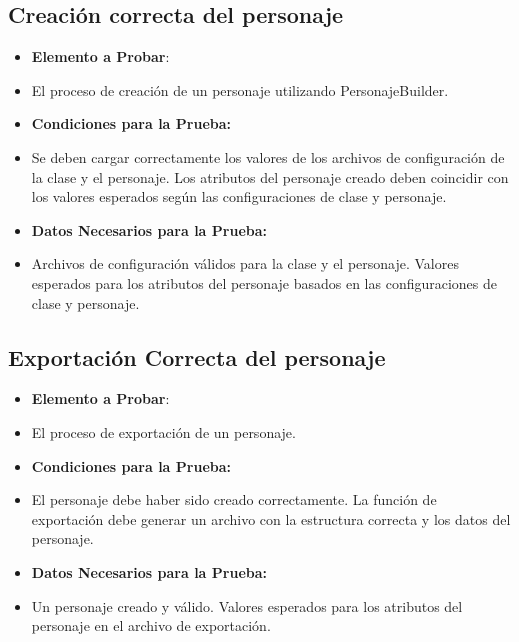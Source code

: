 \documentclass{article}
\begin{document}
\subsection{Creación correcta del personaje}
\renewcommand{\labelitemi}{}
\begin{itemize}

\item \textbf{Elemento a Probar}: 

\item El proceso de creación de un personaje utilizando PersonajeBuilder.

\item \textbf{Condiciones para la Prueba:}

\item Se deben cargar correctamente los valores de los archivos de configuración de la clase y el personaje.
Los atributos del personaje creado deben coincidir con los valores esperados según las configuraciones de clase y personaje.

\item \textbf{Datos Necesarios para la Prueba:}

\item Archivos de configuración válidos para la clase y el personaje.
Valores esperados para los atributos del personaje basados en las configuraciones de clase y personaje.

\end{itemize}

\subsection{Exportación Correcta del personaje}
\renewcommand{\labelitemi}{}
\begin{itemize}

\item \textbf{Elemento a Probar}:

\item El proceso de exportación de un personaje.

\item \textbf{Condiciones para la Prueba:}

\item El personaje debe haber sido creado correctamente.
La función de exportación debe generar un archivo con la estructura correcta y los datos del personaje.

\item \textbf{Datos Necesarios para la Prueba:}

\item Un personaje creado y válido.
Valores esperados para los atributos del personaje en el archivo de exportación.

\end{itemize}
\end{document}
